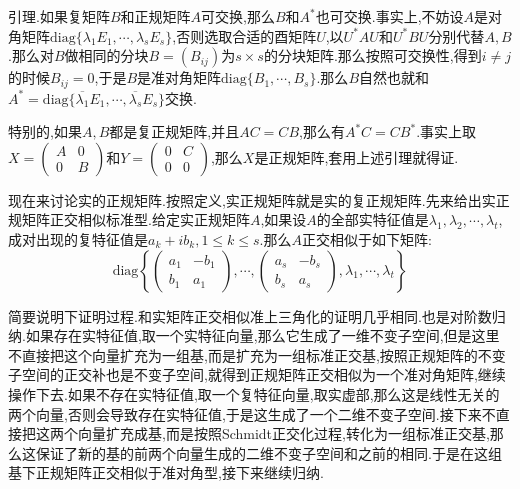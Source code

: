 引理.如果复矩阵$B$和正规矩阵$A$可交换,那么$B$和$A^*$也可交换.事实上,不妨设$A$是对角矩阵$\mathrm{diag}\{\lambda_1E_1,\cdots,\lambda_sE_s\}$,否则选取合适的酉矩阵$U$,以$U^*AU$和$U^*BU$分别代替$A,B$.那么对$B$做相同的分块$B=(B_{ij})$为$s\times s$的分块矩阵.那么按照可交换性,得到$i\not=j$的时候$B_{ij}=0$,于是$B$是准对角矩阵$\mathrm{diag}\{B_1,\cdots,B_s\}$.那么$B$自然也就和$A^*=\mathrm{diag}\{\overline{\lambda_1}E_1,\cdots,\overline{\lambda_s}E_s\}$交换.

特别的,如果$A,B$都是复正规矩阵,并且$AC=CB$,那么有$A^*C=CB^*$.事实上取$X=\left(\begin{array}{cc}
A&0\\
0&B\end{array}\right)$和$Y=\left(\begin{array}{cc}
0&C\\
0&0\end{array}\right)$,那么$X$是正规矩阵,套用上述引理就得证.

现在来讨论实的正规矩阵.按照定义,实正规矩阵就是实的复正规矩阵.先来给出实正规矩阵正交相似标准型.给定实正规矩阵$A$,如果设$A$的全部实特征值是$\lambda_1,\lambda_2,\cdots,\lambda_t$,成对出现的复特征值是$a_k+ib_k,1\le k\le s$.那么$A$正交相似于如下矩阵:
$$\mathrm{diag}\left\{\left(\begin{array}{cc}
a_1&-b_1\\
b_1&a_1\end{array}\right),\cdots,\left(\begin{array}{cc}
a_s&-b_s\\
b_s&a_s\end{array}\right),\lambda_1,\cdots,\lambda_t\right\}$$

简要说明下证明过程.和实矩阵正交相似准上三角化的证明几乎相同.也是对阶数归纳.如果存在实特征值,取一个实特征向量,那么它生成了一维不变子空间,但是这里不直接把这个向量扩充为一组基,而是扩充为一组标准正交基,按照正规矩阵的不变子空间的正交补也是不变子空间,就得到正规矩阵正交相似为一个准对角矩阵,继续操作下去.如果不存在实特征值,取一个复特征向量,取实虚部,那么这是线性无关的两个向量,否则会导致存在实特征值,于是这生成了一个二维不变子空间.接下来不直接把这两个向量扩充成基,而是按照Schmidt正交化过程,转化为一组标准正交基,那么这保证了新的基的前两个向量生成的二维不变子空间和之前的相同.于是在这组基下正规矩阵正交相似于准对角型,接下来继续归纳.

